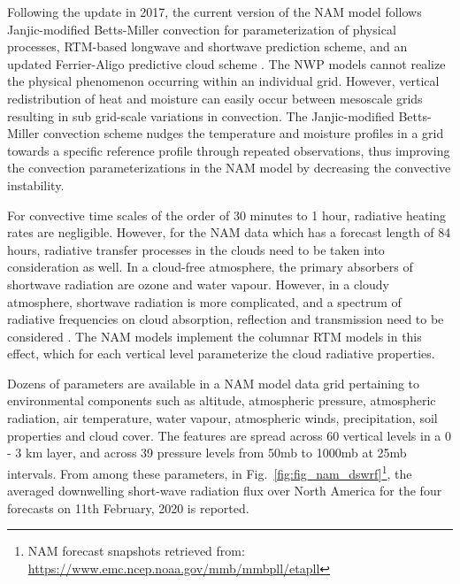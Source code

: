 \par Following the update in 2017, the current version of the NAM model follows Janjic-modified Betts-Miller convection \cite{multimodel_janjic} for parameterization of physical processes, RTM-based longwave and shortwave prediction scheme, and an updated Ferrier-Aligo predictive cloud scheme \cite{multimodel_cloud}. The NWP models cannot realize the  physical phenomenon occurring within an individual grid. However, vertical redistribution of heat and moisture can easily occur between mesoscale grids resulting in sub grid-scale variations in convection. The Janjic-modified Betts-Miller convection scheme nudges the temperature and moisture profiles in a grid towards a specific reference profile through repeated observations, thus improving the convection parameterizations in the NAM model by decreasing the convective instability.

\par For convective time scales of the order of 30 minutes to 1 hour, radiative heating rates are negligible. However, for the NAM data which has a forecast length of 84 hours, radiative transfer processes in the clouds need to be taken into consideration as well. In a cloud-free atmosphere, the primary absorbers of shortwave radiation are ozone and water vapour. However, in a cloudy atmosphere, shortwave radiation is more complicated, and a spectrum of radiative frequencies on cloud absorption, reflection and transmission need to be considered \cite{multimodel_rtm}. The NAM models implement the columnar RTM models in this effect, which for each vertical level parameterize the cloud radiative properties.

\par Dozens of parameters are available in a NAM model data grid pertaining to environmental components such as altitude, atmospheric pressure, atmospheric radiation, air temperature, water vapour, atmospheric winds, precipitation, soil properties and cloud cover. The features are spread across 60 vertical levels in a 0 - 3 km layer, and across 39 pressure levels from 50mb to 1000mb at 25mb intervals. From among these parameters, in Fig.~\ref{fig:fig_nam_dswrf}\footnote{NAM forecast snapshots retrieved from: \url{https://www.emc.ncep.noaa.gov/mmb/mmbpll/etapll}}, the averaged downwelling short-wave radiation flux over North America for the four forecasts on 11th February, 2020 is reported.

